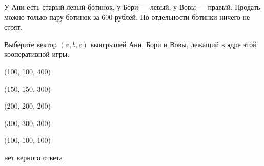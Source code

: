 
\begin{question}
У Ани есть старый левый ботинок, у Бори --- левый, у Вовы --- правый.
Продать можно только пару ботинок за 600 рублей. По отдельности ботинки
ничего не стоят.

Выберите вектор \((a, b, c)\) выигрышей Ани, Бори и Вовы, лежащий в ядре
этой кооперативной игры.
\begin{answerlist}
  \item (100, 100, 400)
  \item (150, 150, 300)
  \item (200, 200, 200)
  \item (300, 300, 300)
  \item (100, 100, 100)
  \item нет верного ответа
\end{answerlist}
\end{question}



